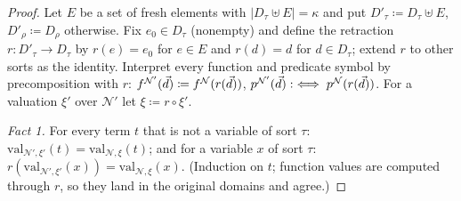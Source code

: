 \begin{proof}
Let $E$ be a set of fresh elements with $|D_\tau \uplus E| =
\kappa$ and put $D'_\tau \coloneqq D_\tau \uplus E$, $D'_\rho
\coloneqq D_\rho$ otherwise.  Fix $e_0 \in D_\tau$ (nonempty) and
define the retraction $r : D'_\tau \to D_\tau$ by $r(e) = e_0$ for
$e \in E$ and $r(d) = d$ for $d \in D_\tau$; extend $r$ to other
sorts as the identity.  Interpret every function and predicate
symbol by precomposition with $r$:
$f^{\mathcal{N}'}(\vec{d}) \coloneqq f^{\mathcal{N}}(r(\vec{d}))$,
$p^{\mathcal{N}'}(\vec{d}) :\iff p^{\mathcal{N}}(r(\vec{d}))$.
For a valuation $\xi'$ over $\mathcal{N}'$ let $\xi \coloneqq r
\circ \xi'$.

\emph{Fact 1.}  For every term $t$ that is not a variable of sort
$\tau$: $\mathrm{val}_{\mathcal{N}',\xi'}(t) =
\mathrm{val}_{\mathcal{N},\xi}(t)$; and for a variable $x$ of sort
$\tau$: $r(\mathrm{val}_{\mathcal{N}',\xi'}(x)) =
\mathrm{val}_{\mathcal{N},\xi}(x)$.  (Induction on $t$; function
values are computed through $r$, so they land in the original
domains and agree.)


\end{proof}
